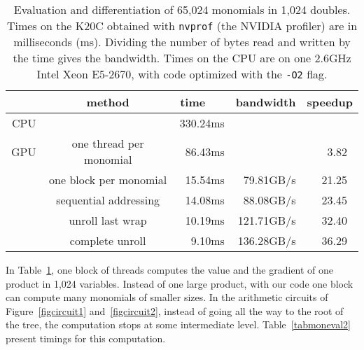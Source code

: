 \documentclass{article}
\begin{document}
\begin{table}[bh]
\caption{Evaluation and differentiation of 65,024 monomials
in 1,024 doubles.  
Times on the K20C obtained with {\tt nvprof} (the NVIDIA profiler)
are in milliseconds (ms).
Dividing the number of bytes read and written by the time
gives the bandwidth.
Times on the CPU are on one 2.6GHz Intel Xeon E5-2670,
with code optimized with the {\tt -O2} flag.}
\begin{center}
\begin{tabular}{r|c|rr|r}
    &           method          & time~~~  & bandwidth  & speedup \\ \hline
CPU &                           & 330.24ms &            &         \\ \hline
GPU & one thread per monomial   &  86.43ms &            &   3.82~  \\
    & one  block per monomial   &  15.54ms &  79.81GB/s &  21.25~  \\
    & sequential addressing     &  14.08ms &  88.08GB/s &  23.45~  \\
    &  unroll last wrap         &  10.19ms & 121.71GB/s &  32.40~  \\
    &  complete unroll          &   9.10ms & 136.28GB/s &  36.29~
\end{tabular}
\label{tabmoneval}
\end{center}
\end{table}

In Table~\ref{tabmoneval}, one block of threads computes the value
and the gradient of one product in 1,024 variables.
Instead of one large product, with our code one block can compute 
many monomials of smaller sizes.  In the arithmetic circuits of
Figure~\ref{figcircuit1} and~\ref{figcircuit2}, instead of going
all the way to the root of the tree,
the computation stops at some intermediate level.
Table~\ref{tabmoneval2} present timings for this computation.
\end{document}

